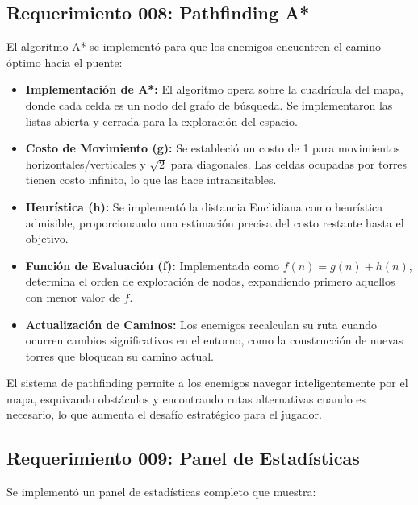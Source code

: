 \documentclass[a4paper,num-refs]{oup-contemporary}
\begin{document}
\subsection{Requerimiento 008: Pathfinding A*}
El algoritmo A* se implementó para que los enemigos encuentren el camino óptimo hacia el puente:

\begin{itemize}
    \item \textbf{Implementación de A*:} El algoritmo opera sobre la cuadrícula del mapa, donde cada celda es un nodo del grafo de búsqueda. Se implementaron las listas abierta y cerrada para la exploración del espacio.
    \item \textbf{Costo de Movimiento (g):} Se estableció un costo de 1 para movimientos horizontales/verticales y $\sqrt{2}$ para diagonales. Las celdas ocupadas por torres tienen costo infinito, lo que las hace intransitables.
    \item \textbf{Heurística (h):} Se implementó la distancia Euclidiana como heurística admisible, proporcionando una estimación precisa del costo restante hasta el objetivo.
    \item \textbf{Función de Evaluación (f):} Implementada como $f(n) = g(n) + h(n)$, determina el orden de exploración de nodos, expandiendo primero aquellos con menor valor de $f$.
    \item \textbf{Actualización de Caminos:} Los enemigos recalculan su ruta cuando ocurren cambios significativos en el entorno, como la construcción de nuevas torres que bloquean su camino actual.
\end{itemize}

El sistema de pathfinding permite a los enemigos navegar inteligentemente por el mapa, esquivando obstáculos y encontrando rutas alternativas cuando es necesario, lo que aumenta el desafío estratégico para el jugador.

\subsection{Requerimiento 009: Panel de Estadísticas}
Se implementó un panel de estadísticas completo que muestra:
\end{document}
